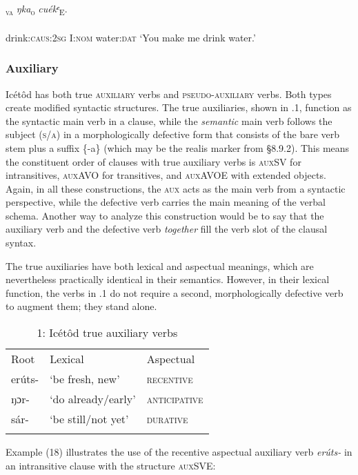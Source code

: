 \ea\label{ex:}
\textsc{\textsubscript{va}}\textit{}   \textit{ŋka}\textsc{\textsubscript{o}}\textit{     cuékᵉ}\textsc{\textsubscript{E}}. \\
    \\
drink:\textsc{caus:2sg} I:\textsc{nom}    water:\textsc{dat}
\glt ‘You make me drink water.’ 
\z




\subsubsection{Auxiliary} 

Icétôd has both true \textsc{auxiliary} verbs and \textsc{pseudo-auxiliary} verbs. Both types create modified syntactic structures. The true auxiliaries, shown in .1, function as the syntactic main verb in a clause, while the \textit{semantic} main verb follows the subject (\textsc{s/a}) in a morphologically defective form that consists of the bare verb stem plus a suffix \{-a\} (which may be the realis marker from §8.9.2). This means the constituent order of clauses with true auxiliary verbs is \textsc{auxSV} for intransitives, \textsc{auxAVO} for transitives, and \textsc{auxAVOE} with extended objects. Again, in all these constructions, the \textsc{aux} acts as the main verb from a syntactic perspective, while the defective verb carries the main meaning of the verbal schema. Another way to analyze this construction would be to say that the auxiliary verb and the defective verb \textit{together} fill the verb slot of the clausal syntax.

The true auxiliaries have both lexical and aspectual meanings, which are nevertheless practically identical in their semantics. However, in their lexical function, the verbs in .1 do not require a second, morphologically defective verb to augment them; they stand alone.


\begin{table}
\caption{1: Icétôd true auxiliary verbs}
\label{tab:10}


\begin{tabularx}{\textwidth}{XXX}
\lsptoprule

Root & Lexical & Aspectual\\
erúts- & ‘be fresh, new’ & \textsc{recentive}\\
ŋɔr- & ‘do already/early’ & \textsc{anticipative}\\
sár- & ‘be still/not yet’ & \textsc{durative}\\
\lspbottomrule
\end{tabularx}
\end{table}
Example (18) illustrates the use of the recentive aspectual auxiliary verb \textit{erúts-} in an intransitive clause with the structure \textsc{auxSVE:}




